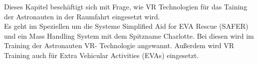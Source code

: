 
Dieses Kapitel beschäftigt sich mit Frage, wie VR Technologien für das Taining der Astronauten in der Raumfahrt eingesetzt wird.\\
Es geht im Speziellen um die Systeme Simplified Aid for EVA Rescue (SAFER) und ein Mass Handling System mit dem Spitzname Charlotte.
Bei diesen wird im Training der Astronauten VR- Technologie angewannt. Außerdem wird VR Training auch für Extra Vehicular
Activities (EVAs) eingesetzt.
